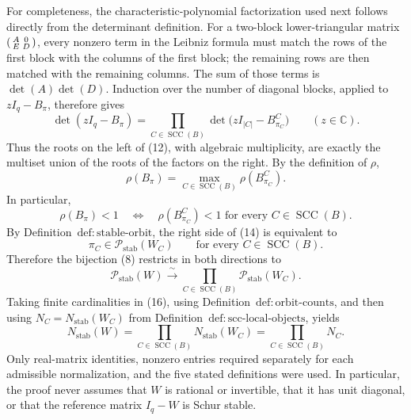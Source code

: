 For completeness, the characteristic-polynomial factorization used next follows directly from the determinant definition.  For a two-block lower-triangular matrix
\(
 \begin{psmallmatrix}A&0\\ E&D\end{psmallmatrix}
\), every nonzero term in the Leibniz formula must match the rows of the first block with the columns of the first block; the remaining rows are then matched with the remaining columns.  The sum of those terms is \(\det(A)\det(D)\).  Induction over the number of diagonal blocks, applied to \(zI_q-B_\pi\), therefore gives
\[
 \det(zI_q-B_\pi)
 =\prod_{C\in\operatorname{SCC}(B)}
 \det\bigl(zI_{|C|}-B^C_{\pi_C}\bigr)
 \qquad(z\in\mathbb C). \tag{12}
\]
Thus the roots on the left of (12), with algebraic multiplicity, are exactly the multiset union of the roots of the factors on the right.  By the definition of \(\rho\),
\[
 \rho(B_\pi)
 =\max_{C\in\operatorname{SCC}(B)}
 \rho(B^C_{\pi_C}). \tag{13}
\]
In particular,
\[
 \rho(B_\pi)<1
 \quad\Longleftrightarrow\quad
 \rho(B^C_{\pi_C})<1
 \text{ for every }C\in\operatorname{SCC}(B). \tag{14}
\]
By Definition~\(\mathrm{def:stable\text{-}orbit}\), the right side of (14) is equivalent to
\[
 \pi_C\in\mathcal P_{\mathrm{stab}}(W_C)
 \qquad\text{for every }C\in\operatorname{SCC}(B). \tag{15}
\]
Therefore the bijection (8) restricts in both directions to
\[
 \mathcal P_{\mathrm{stab}}(W)
 \xrightarrow{\ \sim\ }
 \prod_{C\in\operatorname{SCC}(B)}
 \mathcal P_{\mathrm{stab}}(W_C). \tag{16}
\]
Taking finite cardinalities in (16), using Definition~\(\mathrm{def:orbit\text{-}counts}\), and then using \(N_C=N_{\mathrm{stab}}(W_C)\) from Definition~\(\mathrm{def:scc\text{-}local\text{-}objects}\), yields
\[
 N_{\mathrm{stab}}(W)
 =\prod_{C\in\operatorname{SCC}(B)}N_{\mathrm{stab}}(W_C)
 =\prod_{C\in\operatorname{SCC}(B)}N_C. \tag{17}
\]
Only real-matrix identities, nonzero entries required separately for each admissible normalization, and the five stated definitions were used.  In particular, the proof never assumes that \(W\) is rational or invertible, that it has unit diagonal, or that the reference matrix \(I_q-W\) is Schur stable.
